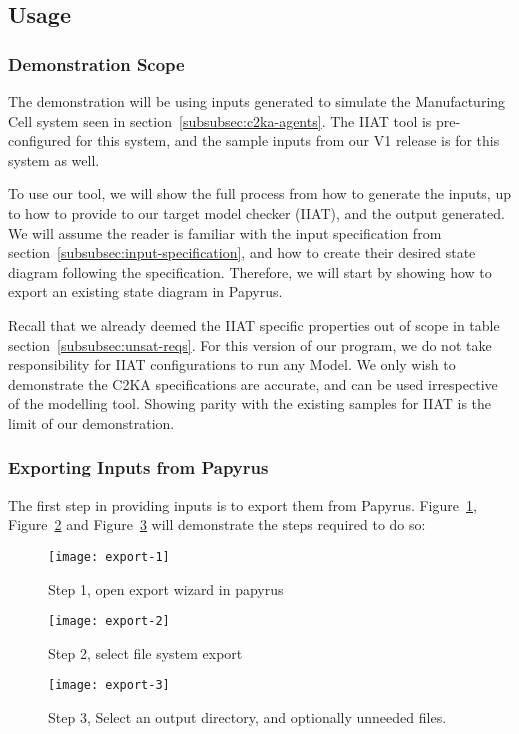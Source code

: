\subsection{Usage}\label{subsec:usage}
\subsubsection{Demonstration Scope}\label{subsubsec:scope}
The demonstration will be using inputs generated to simulate the Manufacturing Cell system seen in section~\ref{subsubsec:c2ka-agents}.
The IIAT tool is pre-configured for this system, and the sample inputs from our V1 release is for this system as well.

To use our tool, we will show the full process from how to generate the inputs,
up to how to provide to our target model checker (IIAT), and the output generated.
We will assume the reader is familiar with the input specification from section~\ref{subsubsec:input-specification},
and how to create their desired state diagram following the specification.
Therefore, we will start by showing how to export an existing state diagram in Papyrus.

Recall that we already deemed the IIAT specific properties out of scope in table section~\ref{subsubsec:unsat-reqs}.
For this version of our program, we do not take responsibility for IIAT configurations to run any Model.
We only wish to demonstrate the C2KA specifications are accurate, and can be used irrespective of the modelling tool.
Showing parity with the existing samples for IIAT is the limit of our demonstration.


\subsubsection{Exporting Inputs from Papyrus}
The first step in providing inputs is to export them from Papyrus.
Figure~\ref{fig:export-1}, Figure~\ref{fig:export-2} and Figure~\ref{fig:export-3} will demonstrate the steps required to do so:
\begin{figure}[h]
    \centering
    \texttt{[image: export-1]}
    \caption{Step 1, open export wizard in papyrus}
    \label{fig:export-1}
\end{figure}
\begin{figure}[h]
    \centering
    \texttt{[image: export-2]}
    \caption{Step 2, select file system export}
    \label{fig:export-2}
\end{figure}
\begin{figure}[h]
    \centering
    \texttt{[image: export-3]}
    \caption{Step 3, Select an output directory, and optionally unneeded files.}
    \label{fig:export-3}
\end{figure}

